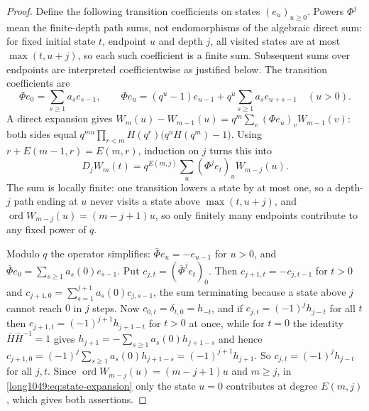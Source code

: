\documentclass[11pt]{article}
\begin{document}
\begin{proof}
Define the following transition coefficients on states $(e_u)_{u\ge0}$.
Powers $\Phi^j$ mean the finite-depth path sums, not endomorphisms of the
algebraic direct sum: for fixed initial state $t$, endpoint $u$ and depth $j$,
all visited states are at most $\max(t,u+j)$, so each such coefficient is a
finite sum.  Subsequent sums over endpoints are interpreted coefficientwise
as justified below.  The transition coefficients are
\[
 \Phi e_0=\sum_{s\ge1}a_se_{s-1},
 \qquad
 \Phi e_u=(q^{u}-1)e_{u-1}+q^{u}\sum_{s\ge1}a_se_{u+s-1}\quad(u>0).
\]
A direct expansion gives
$W_m(u)-W_{m-1}(u)=q^{m}\sum_v(\Phi e_u)_vW_{m-1}(v)$: both sides equal
$q^{mu}\prod_{r<m}H(q^{r})\bigl(q^{u}H(q^{m})-1\bigr)$.  Using
$r+E(m-1,r)=E(m,r)$, induction on $j$ turns this into
\begin{equation}\label{long1049:eq:state-expansion}
 D_jW_m(t)=q^{E(m,j)}\sum_u(\Phi^{j}e_t)_uW_{m-j}(u).
\end{equation}
The sum is locally finite: one transition lowers a state by at most one, so a
depth-$j$ path ending at $u$ never visits a state above $\max(t,u+j)$, and
$\operatorname{ord}W_{m-j}(u)=(m-j+1)u$, so only finitely many endpoints
contribute to any fixed power of $q$.

Modulo $q$ the operator simplifies: $\bar\Phi e_u=-e_{u-1}$ for $u>0$, and
$\bar\Phi e_0=\sum_{s\ge1}a_s(0)e_{s-1}$.  Put $c_{j,t}=(\bar\Phi^{j}e_t)_0$.
Then $c_{j+1,t}=-c_{j,t-1}$ for $t>0$ and
$c_{j+1,0}=\sum_{s=1}^{j+1}a_s(0)c_{j,s-1}$, the sum terminating because a state
above $j$ cannot reach $0$ in $j$ steps.  Now $c_{0,t}=\delta_{t,0}=h_{-t}$, and
if $c_{j,t}=(-1)^{j}h_{j-t}$ for all $t$ then $c_{j+1,t}=(-1)^{j+1}h_{j+1-t}$ for
$t>0$ at once, while for $t=0$ the identity $\bar H\bar H^{-1}=1$ gives
$h_{j+1}=-\sum_{s\ge1}a_s(0)h_{j+1-s}$ and hence
$c_{j+1,0}=(-1)^{j}\sum_{s\ge1}a_s(0)h_{j+1-s}=(-1)^{j+1}h_{j+1}$.  So
$c_{j,t}=(-1)^{j}h_{j-t}$ for all $j,t$.  Since
$\operatorname{ord}W_{m-j}(u)=(m-j+1)u$ and $m\ge j$, in
\eqref{long1049:eq:state-expansion} only the state $u=0$ contributes at degree $E(m,j)$,
which gives both assertions.
\end{proof}
\end{document}

